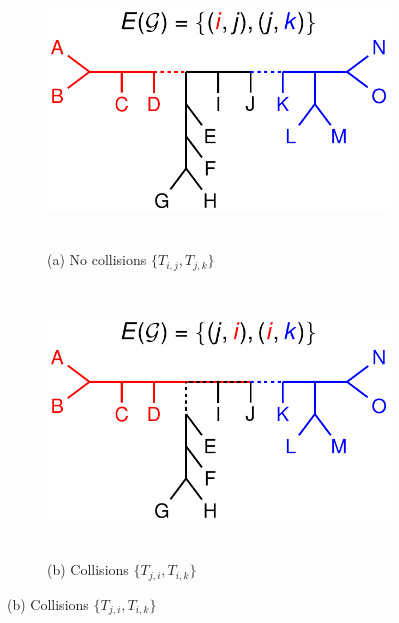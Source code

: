 \begin{figure}[!h]
\centering
	\begin{subfigure}[t]{0.45\textwidth}
	\centering
		\includegraphics[width=\textwidth]{figures/treemerge-fig3a.pdf}
		~
		\caption{(a) No collisions $\{ T_{i,j}, T_{j,k} \}$} 
	\end{subfigure}
	~~~~~~~~~~
	\begin{subfigure}[t]{0.45\textwidth}
	\centering
		\includegraphics[width=\textwidth]{figures/treemerge-fig3b.pdf}
		~
		\caption{(b) Collisions $\{ T_{j,i}, T_{i,k} \}$} 
	\end{subfigure}

	\vspace{24pt}


\end{figure}

